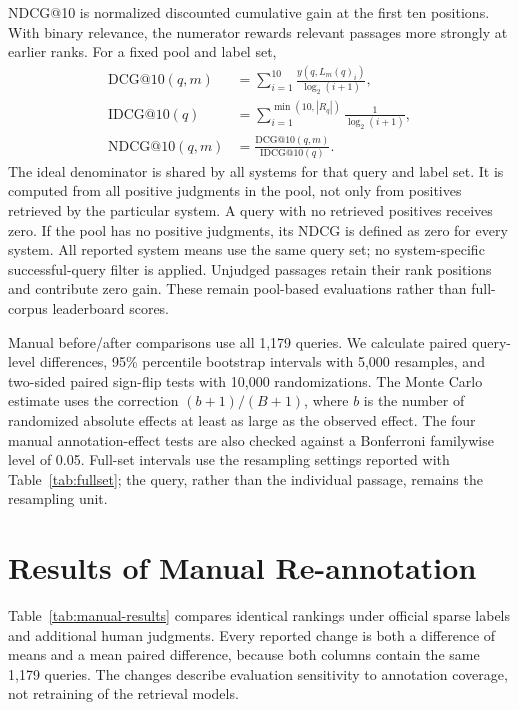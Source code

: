 \documentclass[runningheads,a4paper]{llncs}
\begin{document}
NDCG@10 is normalized discounted cumulative gain at the first ten positions. With binary relevance, the numerator rewards relevant passages more strongly at earlier ranks. For a fixed pool and label set,
\begin{align}
\mathrm{DCG}@10(q,m)&=\sum_{i=1}^{10}\frac{y(q,L_m(q)_i)}{\log_2(i+1)},\\
\mathrm{IDCG}@10(q)&=\sum_{i=1}^{\min(10,|R_q|)}\frac{1}{\log_2(i+1)},\\
\mathrm{NDCG}@10(q,m)&=\frac{\mathrm{DCG}@10(q,m)}{\mathrm{IDCG}@10(q)}.
\label{eq:ndcg}
\end{align}
The ideal denominator is shared by all systems for that query and label set. It is computed from all positive judgments in the pool, not only from positives retrieved by the particular system. A query with no retrieved positives receives zero. If the pool has no positive judgments, its NDCG is defined as zero for every system. All reported system means use the same query set; no system-specific successful-query filter is applied. Unjudged passages retain their rank positions and contribute zero gain. These remain pool-based evaluations rather than full-corpus leaderboard scores.

Manual before/after comparisons use all 1,179 queries. We calculate paired query-level differences, 95\% percentile bootstrap intervals with 5,000 resamples, and two-sided paired sign-flip tests with 10,000 randomizations. The Monte Carlo estimate uses the correction \((b+1)/(B+1)\), where \(b\) is the number of randomized absolute effects at least as large as the observed effect. The four manual annotation-effect tests are also checked against a Bonferroni familywise level of 0.05. Full-set intervals use the resampling settings reported with Table~\ref{tab:fullset}; the query, rather than the individual passage, remains the resampling unit.

\section{Results of Manual Re-annotation}
\label{sec:manual-results}

Table~\ref{tab:manual-results} compares identical rankings under official sparse labels and additional human judgments. Every reported change is both a difference of means and a mean paired difference, because both columns contain the same 1,179 queries. The changes describe evaluation sensitivity to annotation coverage, not retraining of the retrieval models.
\end{document}
